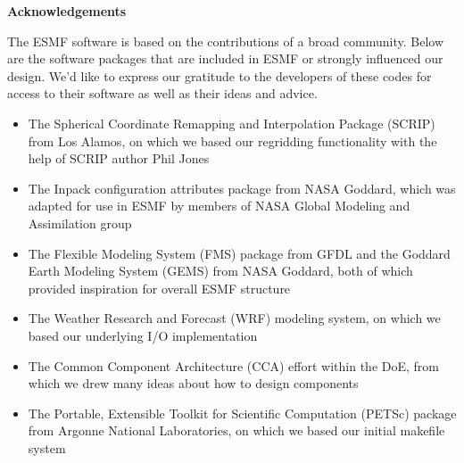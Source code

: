 
\vspace{2in}
\begin{center}
{\bf Acknowledgements}
\end{center}

The ESMF software is based on the contributions of a broad community.
Below are the software packages that are included in ESMF or strongly 
influenced our design.  We'd like to express our gratitude to the 
developers of these codes for access to their software as well as their 
ideas and advice.

\begin{itemize}

\item The Spherical Coordinate Remapping and Interpolation Package (SCRIP) 
from Los Alamos, on which we based our regridding functionality with the
help of SCRIP author Phil Jones

\item The Inpack configuration attributes package from NASA Goddard, 
which was adapted for use in ESMF by members of NASA Global Modeling and 
Assimilation group

\item The Flexible Modeling System (FMS) package from GFDL and the 
Goddard Earth Modeling System (GEMS) from NASA Goddard, both of which 
provided inspiration for overall ESMF structure

\item The Weather Research and Forecast (WRF) modeling system, on which 
we based our underlying I/O implementation

\item The Common Component Architecture (CCA) effort within the DoE,
from which we drew many ideas about how to design components

\item The Portable, Extensible Toolkit for Scientific Computation (PETSc) 
package from Argonne National Laboratories, on which we 
based our initial makefile system

\end{itemize}
